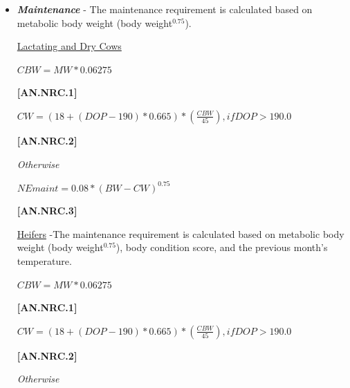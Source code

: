 \begin{refsection}
    \begin{itemize}
        \item \textbf{\textit{Maintenance}} - The maintenance requirement is calculated based on metabolic body weight (body weight\(^ {0.75}\)).
        
        \vspace{0.2cm}
        \underline {Lactating and Dry Cows}
        
        \vspace{0.25cm}
\begin{center}
    \(CBW = MW * 0.06275\)
\end{center}
\vspace{0.5cm}
            {\raggedleft \textbf{[AN.NRC.1]}\par}

\vspace{0.25cm}
\begin{center}
    \(CW = {(18 + (DOP - 190) * 0.665) * ( \frac{CBW}{45}), if DOP > 190.0}\)
\end{center}
\vspace{0.5cm}
            {\raggedleft \textbf{[AN.NRC.2]}\par}
\textit{\small Otherwise}
\vspace{0.25cm}

\begin{center}
    \(NEmaint = 0.08 * (BW - CW)^{0.75}\)
\end{center}
\vspace{0.5cm}
            {\raggedleft \textbf{[AN.NRC.3]}\par}

        \vspace{0.2cm}
        \underline {Heifers} -The maintenance requirement is calculated based on metabolic body weight (body weight\(^{0.75}\)), body condition score, and the previous month's temperature.
        \vspace{0.25cm}

    
\begin{center}
    \(CBW = MW * 0.06275\)
\end{center}
\vspace{0.5cm}
            {\raggedleft \textbf{[AN.NRC.1]}\par}

\vspace{0.25cm}
\begin{center}
    \(CW = {(18 + (DOP - 190) * 0.665) * ( \frac{CBW}{45}), if DOP > 190.0}\)
\end{center}
\vspace{0.5cm}
            {\raggedleft \textbf{[AN.NRC.2]}\par}
\textit{\small Otherwise}
\vspace{0.25cm}



\end{itemize}
\end{refsection}
